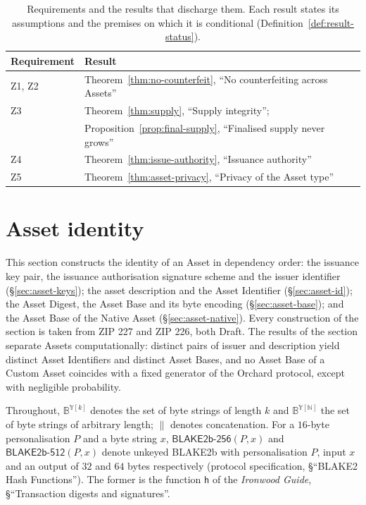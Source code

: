 \documentclass[11pt,a4paper]{article}
\theoremstyle{definition}
\begin{document}
\begin{table}[ht]
\centering\small
\begin{tabular}{@{}ll@{}}
\toprule
Requirement & Result \\
\midrule
Z1, Z2 & Theorem~\ref{thm:no-counterfeit}, ``No counterfeiting across
  Assets'' \\
Z3 & Theorem~\ref{thm:supply}, ``Supply integrity''; \\
  & Proposition~\ref{prop:final-supply}, ``Finalised supply never grows'' \\
Z4 & Theorem~\ref{thm:issue-authority}, ``Issuance authority'' \\
Z5 & Theorem~\ref{thm:asset-privacy}, ``Privacy of the Asset type'' \\
\bottomrule
\end{tabular}
\caption{Requirements and the results that discharge them. Each result
states its assumptions and the premises on which it is conditional
(Definition~\ref{def:result-status}).}
\label{tab:req-results}
\end{table}
\FloatBarrier

\section{Asset identity}\label{sec:asset}

This section constructs the identity of an Asset in dependency order: the
issuance key pair, the issuance authorisation signature scheme and the
issuer identifier (\S\ref{sec:asset-keys}); the asset description and the
Asset Identifier (\S\ref{sec:asset-id}); the Asset Digest, the Asset Base
and its byte encoding (\S\ref{sec:asset-base}); and the Asset Base of the
Native Asset (\S\ref{sec:asset-native}). Every construction of the section
is taken from ZIP 227 and ZIP 226, both Draft. The results of the section
separate Assets computationally: distinct pairs of issuer and description
yield distinct Asset Identifiers and distinct Asset Bases, and no Asset Base
of a Custom Asset coincides with a fixed generator of the Orchard protocol,
except with negligible probability.

Throughout, $\mathbb{B}^{\mathbb{Y}[k]}$ denotes the set of byte strings of
length $k$ and $\mathbb{B}^{\mathbb{Y}[\mathbb{N}]}$ the set of byte strings
of arbitrary length; $\|$ denotes concatenation. For a $16$-byte
personalisation $P$ and a byte string $x$,
$\mathsf{BLAKE2b\text{-}256}(P, x)$ and $\mathsf{BLAKE2b\text{-}512}(P, x)$
denote unkeyed BLAKE2b with personalisation $P$, input $x$ and an output of
$32$ and $64$ bytes respectively (protocol specification, \S``BLAKE2 Hash
Functions''). The former is the function $\mathsf{h}$ of the \emph{Ironwood
Guide}, \S``Transaction digests and signatures''.
\end{document}
